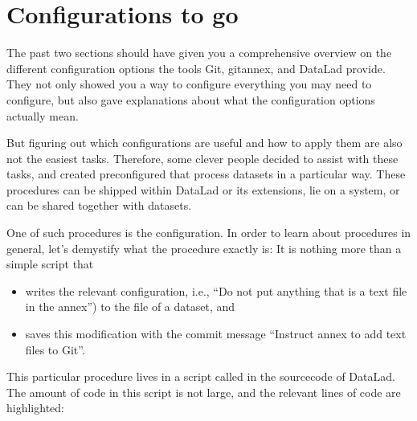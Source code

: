 \section{Configurations to go}
\label{\detokenize{basics/101-124-procedures:configurations-to-go}}\label{\detokenize{basics/101-124-procedures:procedures}}\label{\detokenize{basics/101-124-procedures:index-0}}\label{\detokenize{basics/101-124-procedures::doc}}
\sphinxAtStartPar
The past two sections should have given you a comprehensive
overview on the different configuration options the tools
Git, git\sphinxhyphen{}annex, and DataLad provide. They not only
showed you a way to configure everything you may need to
configure, but also gave explanations about what the
configuration options actually mean.

\sphinxAtStartPar
But figuring out which configurations are useful and how
to apply them are also not the easiest tasks. Therefore,
some clever people decided to assist with
these tasks, and created pre\sphinxhyphen{}configured 
that process datasets in a particular way.
These procedures can be shipped within DataLad or its extensions,
lie on a system, or can be shared together with datasets.

\sphinxAtStartPar
One of such procedures is the  configuration.
In order to learn about procedures in general, let’s demystify
what the  procedure exactly is: It is
nothing more than a simple script that
\begin{itemize}
\item {} 
\sphinxAtStartPar
writes the relevant  configuration,  i.e., “Do not put anything that is a text file in the annex”) to the  file of a dataset, and

\item {} 
\sphinxAtStartPar
saves this modification with the commit message “Instruct annex to add text files to Git”.

\end{itemize}

\sphinxAtStartPar
This particular procedure lives in a script called
 in the sourcecode of DataLad. The amount of code
in this script is not large, and the relevant lines of code
are highlighted:

